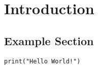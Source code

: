\chapter{Introduction}
\label{ch:introduction}
\minitoc
\section{Example Section}
\label{s:exampleSection}
\begin{lstlisting}[firstnumber=3]
	print("Hello World!")
\end{lstlisting}

